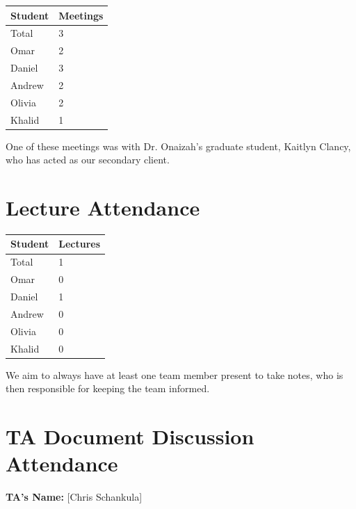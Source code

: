 \documentclass{article}
\begin{document}
\begin{table}[H]
\centering
\begin{tabular}{ll}
\toprule
\textbf{Student} & \textbf{Meetings}\\
\midrule
Total & 3\\
Omar & 2\\
Daniel & 3\\
Andrew & 2\\
Olivia & 2\\
Khalid & 1\\
\bottomrule
\end{tabular}
\end{table}

One of these meetings was with Dr. Onaizah's graduate student, Kaitlyn Clancy, who has acted as our secondary client.

\section{Lecture Attendance}

\begin{table}[H]
\centering
\begin{tabular}{ll}
\toprule
\textbf{Student} & \textbf{Lectures}\\
\midrule
Total & 1\\
Omar & 0\\
Daniel & 1\\
Andrew & 0\\
Olivia & 0\\
Khalid & 0\\
\bottomrule
\end{tabular}
\end{table}

We aim to always have at least one team member present to take notes, who is then responsible for keeping the team informed.

\section{TA Document Discussion Attendance}

\noindent \textbf{TA's Name: } [Chris Schankula]
\end{document}
